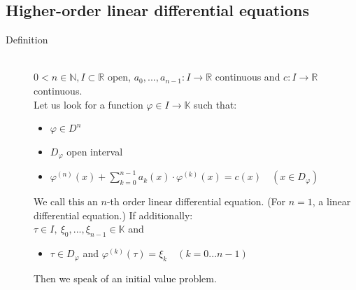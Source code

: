 \documentclass[margin=0px]{article}
\newcommand{\R}{\mathbb{R}}
\begin{document}
\subsection{Higher-order linear differential equations}
\begin{description}
    \item[Definition] \hfill \\
        $ 0 < n \in \mathbb{N}, I \subset \R$ open, $ a_0, ... ,a_{n-1} :I \rightarrow \R$ continuous and $ c: I \rightarrow \R$ continuous. \\
        Let us look for a function $ \varphi \in I \rightarrow \mathbb{K}$ such that:
        \begin{itemize}
            \item $ \varphi \in D^n$
            \item $ D_{\varphi}$ open interval
            \item $ \varphi^{(n)}(x) + \sum\limits_{k=0}^{n-1}a_k(x) \cdot \varphi^{(k)}(x) = c(x) \quad (x \in D_{\varphi}) $
        \end{itemize}

        We call this an $n$-th order linear differential equation. (For $n=1$, a linear differential equation.) If additionally: \\
        $ \tau \in I, \ \xi_0, ... , \xi_{n-1} \in \mathbb{K}$ and
        \begin{itemize}
            \item $ \tau \in D_{\varphi}$ and $ \varphi^{(k)}(\tau) = \xi_k \quad (k = 0...n-1) $
        \end{itemize}
        Then we speak of an initial value problem.


\end{description}
\end{document}
